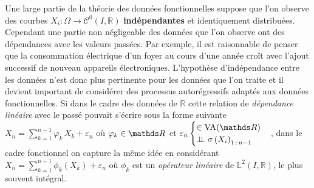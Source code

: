Une large partie de la théorie des données fonctionnelles suppose que l'on observe des courbes $X_i : \Omega \rightarrow \mathcal C^0(I, \mathds R)$ \textbf{indépendantes} et identiquement distribuées. Cependant une partie non négligeable des données que l'on observe ont des dépendances avec les valeurs passées. Par exemple, il est raisonnable de penser que la consommation électrique d'un foyer au cours d'une année croît avec l'ajout successif de nouveau appareils électroniques. L'hypothèse d'indépendance entre les données n'est donc plus pertinente pour les données que l'on traite et il devient important de considérer des processus autorégressifs adaptés aux données fonctionnelles. 
Si dans le cadre des données de $\mathds R$ cette relation de \emph{dépendance linéaire} avec le passé pouvait s'écrire sous la forme suivante 
$X_n = \sum\limits_{k=1}^{n-1} \varphi_k \, X_k + \varepsilon_n$ où $\varphi_k \in \grandR$ 
et 
$\varepsilon_n \begin{cases} \in \operatorname{VA}(\grandR) \\ \indep \sigma\left( X_i \right)_{1\,: \, n-1}\end{cases}$, 
dans le cadre fonctionnel on capture la même idée en considérant 
$X_n = \sum\limits_{k=1}^{n-1} \phi_k \left( X_k \right) + \varepsilon_n$ où $\phi_k$ 
est un \emph{opérateur linéaire} de $\mathds L^2(I, \mathds R)$, 
le plus souvent intégral. 

